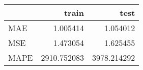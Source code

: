 \begin{tabular}{lrr}
\toprule
{} &        train &         test \\
\midrule
MAE  &     1.005414 &     1.054012 \\
MSE  &     1.473054 &     1.625455 \\
MAPE &  2910.752083 &  3978.214292 \\
\bottomrule
\end{tabular}
